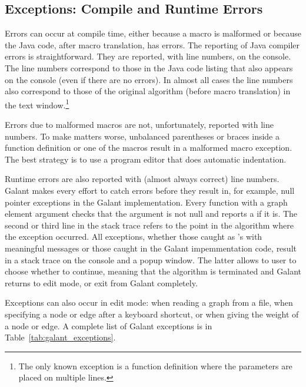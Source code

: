 \subsection{Exceptions: Compile and Runtime Errors}



Errors can occur at compile time, either because a macro is malformed or
because the Java code, after macro translation, has errors.
The reporting of Java compiler errors is straightforward. They are reported,
with line numbers, on the console. The line numbers correspond to those in
the Java code listing that also appears on the console (even if there are no
errors). In almost all cases the line numbers also correspond to those of the
original algorithm (before macro translation) in the text
window.\footnote{The only known exception is a function definition where the
  parameters are placed on multiple lines.}

Errors due to malformed macros are not, unfortunately, reported with line
numbers. To make matters worse, unbalanced parentheses or braces inside a
function definition or one of the  macros result in a
malformed macro exception. The best strategy is to use a program editor that
does automatic indentation.

Runtime errors are also reported with (almost always correct) line
numbers. Galant makes every effort to catch errors before they result in, for
example, null pointer exceptions in the Galant implementation. Every function
with a graph element argument checks that the argument is not null and
reports a  if it is.
The second or third line in the stack trace
refers to the point in the algorithm where the exception occurred.
All exceptions, whether those caught as 's with
meaningful messages or those caught in the Galant impemmentation code, result
in a stack trace on the console and a popup window.
The latter allows to user to choose whether to continue, meaning that the
algorithm is terminated and Galant returns to edit mode, or exit from Galant
completely.

Exceptions can also occur in edit mode: when reading a graph from a
file, when specifying a node or edge after a keyboard shortcut, or when
giving the weight of a node or edge.
A complete list of Galant exceptions is in Table~\ref{tab:galant_exceptions}.

